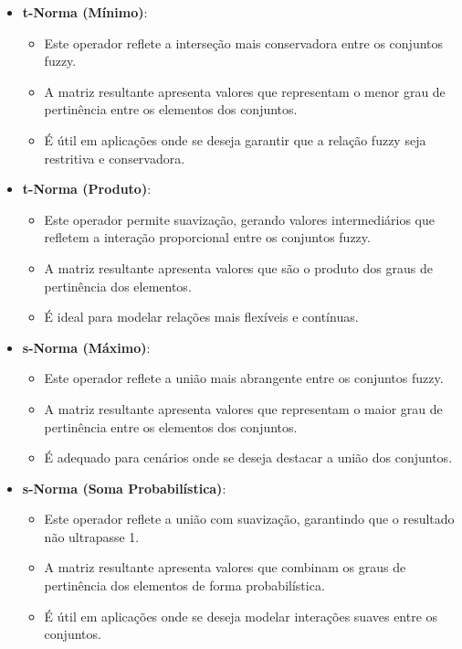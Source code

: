 \documentclass[a4paper,12pt]{article}
\begin{document}
\begin{itemize}
    \item \textbf{t-Norma (Mínimo)}:
    \begin{itemize}
        \item Este operador reflete a interseção mais conservadora entre os conjuntos fuzzy.
        \item A matriz resultante apresenta valores que representam o menor grau de pertinência entre os elementos dos conjuntos.
        \item É útil em aplicações onde se deseja garantir que a relação fuzzy seja restritiva e conservadora.
    \end{itemize}

    \item \textbf{t-Norma (Produto)}:
    \begin{itemize}
        \item Este operador permite suavização, gerando valores intermediários que refletem a interação proporcional entre os conjuntos fuzzy.
        \item A matriz resultante apresenta valores que são o produto dos graus de pertinência dos elementos.
        \item É ideal para modelar relações mais flexíveis e contínuas.
    \end{itemize}

    \item \textbf{s-Norma (Máximo)}:
    \begin{itemize}
        \item Este operador reflete a união mais abrangente entre os conjuntos fuzzy.
        \item A matriz resultante apresenta valores que representam o maior grau de pertinência entre os elementos dos conjuntos.
        \item É adequado para cenários onde se deseja destacar a união dos conjuntos.
    \end{itemize}

    \item \textbf{s-Norma (Soma Probabilística)}:
    \begin{itemize}
        \item Este operador reflete a união com suavização, garantindo que o resultado não ultrapasse 1.
        \item A matriz resultante apresenta valores que combinam os graus de pertinência dos elementos de forma probabilística.
        \item É útil em aplicações onde se deseja modelar interações suaves entre os conjuntos.
    \end{itemize}
\end{itemize}
\end{document}

